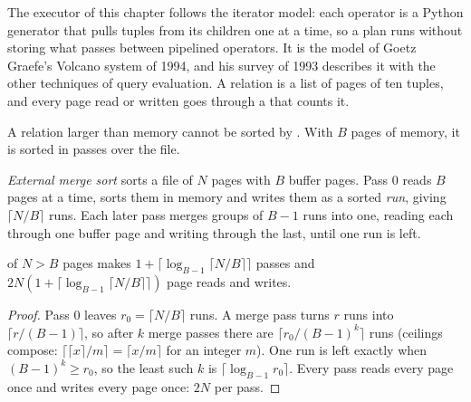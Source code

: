 The executor of this chapter follows the iterator model: each operator is a Python generator that pulls tuples from its children one at a time, so a plan runs without storing what passes between pipelined operators. It is the model of Goetz Graefe's Volcano system of 1994, and his survey of 1993 describes it with the other techniques of query evaluation. %
A relation is a list of pages of ten tuples, and every page read or written goes through a  that counts it.

\label{lst:b3:query-optimisation:exec}

A relation larger than memory cannot be sorted by . With $B$ pages of memory, it is sorted in passes over the file.

\begin{definition}\label{def:b3:query-optimisation:sort}
\emph{External merge sort} sorts a file of $N$ pages with $B$ buffer pages. Pass 0 reads $B$ pages at a time, sorts them in memory and writes them as a sorted \emph{run}, giving $\lceil N/B \rceil$ runs. Each later pass merges groups of $B - 1$ runs into one, reading each through one buffer page and writing through the last, until one run is left.
\end{definition}

\begin{theorem}\label{thm:b3:query-optimisation:sort}
 of $N > B$ pages makes $1 + \lceil \log_{B-1} \lceil N/B \rceil \rceil$ passes and $2N(1 + \lceil \log_{B-1} \lceil N/B \rceil \rceil)$ page reads and writes.
\end{theorem}

\begin{proof}
Pass 0 leaves $r_0 = \lceil N/B \rceil$ runs. A merge pass turns $r$ runs into $\lceil r/(B-1) \rceil$, so after $k$ merge passes there are $\lceil r_0 / (B-1)^k \rceil$ runs (ceilings compose: $\lceil \lceil x \rceil / m \rceil = \lceil x/m \rceil$ for an integer $m$). One run is left exactly when $(B-1)^k \ge r_0$, so the least such $k$ is $\lceil \log_{B-1} r_0 \rceil$. Every pass reads every page once and writes every page once: $2N$ per pass.
\end{proof}

